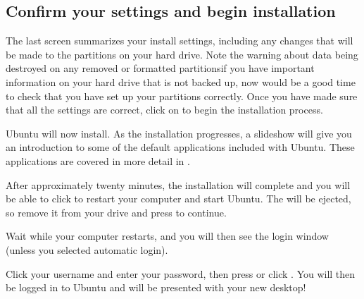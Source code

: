 \subsection{Confirm your settings and begin installation}

The last screen summarizes your install settings, including any changes that will be made to the partitions on your hard drive. Note the warning about data being destroyed on any removed or formatted partitions\dash if you have important information on your hard drive that is not backed up, now would be a good time to check that you have set up your partitions correctly.
Once you have made sure that all the settings are correct, click on  to begin the installation process.

\clearpage

Ubuntu will now install. As the installation progresses, a slideshow will give you an introduction to some of the default applications included with Ubuntu. These applications are covered in more detail in .



After approximately twenty minutes, the installation will complete and you will be able to click  to restart your computer and start Ubuntu. The  will be ejected, so remove it from your  drive and press  to continue.


Wait while your computer restarts, and you will then see the login window (unless you selected automatic login).\clearpage


Click your username and enter your password, then press  or click . You will then be logged in to Ubuntu and will be presented with your new desktop!

